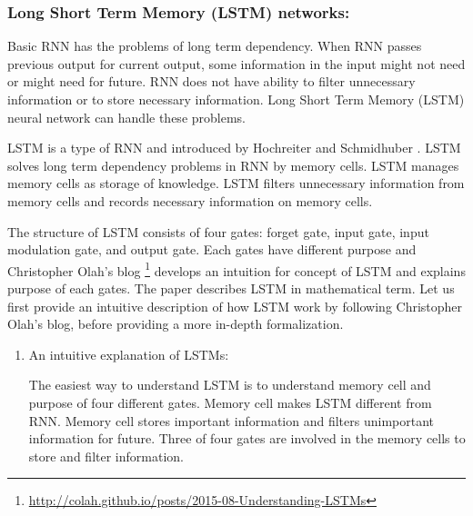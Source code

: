 \documentclass[draft,dvipsnames]{drexel-thesis}
\begin{document}
\begin{thesis}
\subsubsection{Long Short Term Memory (LSTM) networks:}\label{LSTM}
	Basic RNN has the problems of long term dependency. When RNN passes previous output for current output, some information in the input might not need or might need for future. RNN does not have ability to filter unnecessary information or to store necessary information. Long Short Term Memory (LSTM) neural network can handle these problems.

	LSTM is a type of RNN and introduced by Hochreiter and Schmidhuber \cite{hochreiter1997long}. LSTM solves long term dependency problems in RNN by memory cells. LSTM manages memory cells as storage of knowledge. LSTM filters unnecessary information from memory cells and records necessary information on memory cells.

	The structure of LSTM consists of four gates: forget gate, input gate, input modulation gate, and output gate. Each gates have different purpose and Christopher Olah's blog \footnote{\url{http://colah.github.io/posts/2015-08-Understanding-LSTMs}} develops an intuition for concept of LSTM and explains purpose of each gates. The paper \cite{zaremba2014recurrent}  describes LSTM in mathematical term. Let us first provide an intuitive description of how LSTM work by following Christopher Olah's blog, before providing a more in-depth formalization.



\begin{enumerate}
\item An intuitive explanation of LSTMs:

	The easiest way to understand LSTM is to understand memory cell and purpose of four different gates. Memory cell makes LSTM different from RNN. Memory cell stores important information and filters unimportant information for future. Three of four gates are involved in the memory cells to store and filter information.


\end{enumerate}
\end{thesis}
\end{document}
